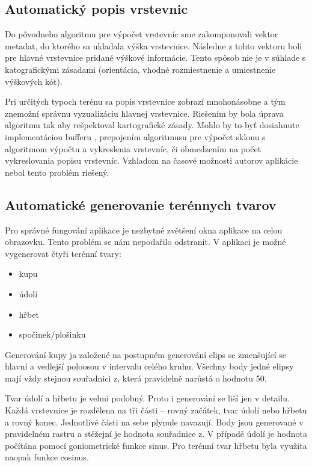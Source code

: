 \documentclass[12pt]{article}
\begin{document}
\subsection{Automatický popis vrstevnic}
Do pôvodneho algoritmu pre výpočet vrstevníc sme zakomponovali vektor metadat, do ktorého sa ukladala výška vrstevnice. Následne z tohto vektoru boli pre hlavné vrstevnice pridané výškové informácie. Tento spôsob nie je v súhlade s katografickými zásadami (orientácia, vhodné rozmiestnenie a umiestnenie výškových kót).

Pri určitých typoch terénu sa popis vrstevnice zobrazí mnohonásobne a tým znemožní správnu vyzualizáciu hlavnej vrstevnice. Riešením by bola úprava algoritmu tak aby rešpektoval kartografické zásady. Mohlo by to byť dosiahnute implementáciou bufferu , prepojením algoritmusu pre výpočet sklonu s algoritmom výpočtu a vykreslenia vrstevníc, či obmedzením na počet vykreslovania popisu vrstevníc. Vzhladom na časové možnosti autorov aplikácie nebol tento problém riešený.

\subsection {Automatické generovanie terénnych tvarov }
Pro správné fungování aplikace je nezbytné zvětšení okna aplikace na celou obrazovku. Tento problém se nám nepodařilo odstranit. V aplikaci je možné vygenerovat čtyři terénní tvary:

\begin{itemize}
\item kupu
\item údolí
\item hřbet
\item spočinek/plošinku
\end{itemize}

Generování kupy ja založené na postupném generování elips se zmenšující se hlavní a vedlejší poloosou v intervalu celého kruhu. Všechny body jedné elipsy mají vždy stejnou souřadnici z, která pravidelně narůstá o hodnotu 50.

Tvar údolí a hřbetu je velmi podobný. Proto i generování se liší jen v detailu. Každá vrstevnice je rozdělena na tři části -- rovný začátek, tvar údolí nebo hřbetu a rovný konec. Jednotlivé části na sebe plynule navazují. Body jsou generované v pravidelném rastru a stěžejní je hodnota souřadnice z. V případě údolí je hodnota počítána pomocí goniometrické funkce sinus. Pro terénní tvar hřbetu byla využita naopak funkce cosinus.
\end{document}
